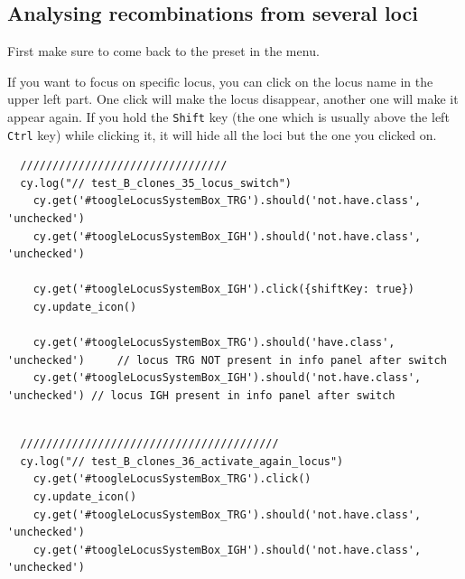 \begin{verbatim}
\end{verbatim}

\subsection{Analysing recombinations from several loci}

First make sure to come back to the preset  in the  menu.

If you want to focus on specific locus, you can click on the locus name in
the upper left part. One click will make the locus disappear, another one will
make it appear again.
If you hold the \texttt{Shift} key (the one which is usually above the left
\texttt{Ctrl} key) while clicking it, it will hide all the loci but the one you
clicked on.

\begin{verbatim}
  ////////////////////////////////
  cy.log("// test_B_clones_35_locus_switch")
    cy.get('#toogleLocusSystemBox_TRG').should('not.have.class', 'unchecked')
    cy.get('#toogleLocusSystemBox_IGH').should('not.have.class', 'unchecked')

    cy.get('#toogleLocusSystemBox_IGH').click({shiftKey: true})
    cy.update_icon()

    cy.get('#toogleLocusSystemBox_TRG').should('have.class', 'unchecked')     // locus TRG NOT present in info panel after switch
    cy.get('#toogleLocusSystemBox_IGH').should('not.have.class', 'unchecked') // locus IGH present in info panel after switch


\end{verbatim}

\begin{verbatim}
  ////////////////////////////////////////
  cy.log("// test_B_clones_36_activate_again_locus")
    cy.get('#toogleLocusSystemBox_TRG').click()
    cy.update_icon()
    cy.get('#toogleLocusSystemBox_TRG').should('not.have.class', 'unchecked')
    cy.get('#toogleLocusSystemBox_IGH').should('not.have.class', 'unchecked')

\end{verbatim}

